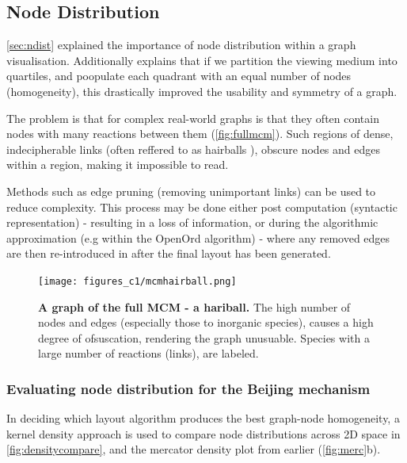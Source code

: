 \subsection{Node Distribution}\label{sec:nodedist}

\autoref{sec:ndist} explained the importance of node distribution within a graph visualisation. Additionally \cite{ch6graphredability} explains that if we partition the viewing medium into quartiles, and poopulate each quadrant with an equal number of nodes (homogeneity), this drastically improved the usability and symmetry of a graph.

The problem is that for complex real-world graphs is that they often contain nodes with many reactions between them (\autoref{fig:fullmcm}). Such regions of dense, indecipherable links (often reffered to as hairballs \citep{vislarge}), obscure nodes and edges within a region, making it impossible to read.

Methods such as edge pruning \citep{edgeprune} (removing unimportant links) can be used to reduce complexity. This process may be done either post computation (syntactic representation) - resulting in a loss of information, or during the algorithmic approximation (e.g within the OpenOrd algorithm) - where any removed edges are then re-introduced in after the final layout has been generated.


\begin{figure}[H]
     \centering
     \texttt{[image: figures\_c1/mcmhairball.png]}
        \caption{\textbf{A graph of the full MCM - a hariball.} The high number of nodes and edges (especially those to inorganic species), causes a high degree of ofsuscation, rendering the graph unusuable. Species with a large number of reactions (links), are labeled.}
        \label{fig:fullmcm}
\end{figure}

\subsubsection{Evaluating node distribution for the Beijing mechanism}


In deciding which layout algorithm produces the best graph-node homogeneity, a kernel density approach is used to compare node distributions across 2D space in \autoref{fig:densitycompare}, and the mercator density plot from earlier (\autoref{fig:merc}b). 


